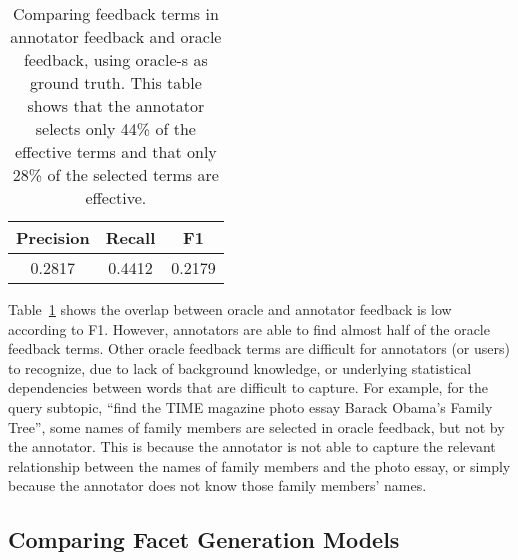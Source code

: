 \begin{table}[H]
\centering
\caption{Comparing feedback terms in annotator feedback and oracle feedback, using oracle-s as ground truth. This table shows that the annotator selects only 44\% of the effective terms and that only 28\% of the selected terms are effective.}
\label{tab:feedback}
\begin{tabular}{|c|c|c|} \hline
Precision & Recall & F1\\  \hline
0.2817 & 0.4412 & 0.2179 \\ \hline
\end{tabular}
\end{table}

Table~\ref{tab:feedback} shows the overlap between oracle and annotator feedback is low according to F1. However, annotators are able to find almost half of the oracle feedback terms. Other oracle feedback terms are difficult for annotators (or users) to recognize, due to lack of background knowledge, or underlying statistical dependencies between words that are difficult to capture. For example, for the query subtopic, ``find the TIME magazine photo essay Barack Obama's Family Tree'', some names of family members are selected in oracle feedback, but not by the annotator. This is because the annotator is not able to capture the relevant relationship between the names of family members and the photo essay, or simply because the annotator does not know those family members' names.

\subsection{Comparing Facet Generation Models}
